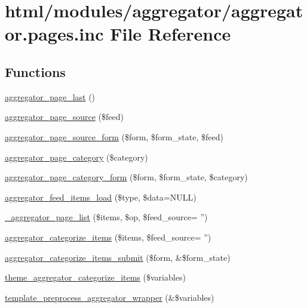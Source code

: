 \hypertarget{aggregator_8pages_8inc}{
\section{html/modules/aggregator/aggregator.pages.inc File Reference}
\label{aggregator_8pages_8inc}
}
\subsection*{Functions}
\begin{DoxyCompactItemize}
\item 
\hyperlink{aggregator_8pages_8inc_a59d236d98e0725864c55ccf6f1ec7eab}{aggregator\_\-page\_\-last} ()
\item 
\hyperlink{aggregator_8pages_8inc_a86e3f4a4faec71de2d52a3c655b62757}{aggregator\_\-page\_\-source} (\$feed)
\item 
\hyperlink{aggregator_8pages_8inc_a8091bff5e7ba3719b50081afe2d51db4}{aggregator\_\-page\_\-source\_\-form} (\$form, \$form\_\-state, \$feed)
\item 
\hyperlink{aggregator_8pages_8inc_aaf7794d54e6d62be94efc636f9a39a4b}{aggregator\_\-page\_\-category} (\$category)
\item 
\hyperlink{aggregator_8pages_8inc_a089dc93129a06c24a1f455105121cb32}{aggregator\_\-page\_\-category\_\-form} (\$form, \$form\_\-state, \$category)
\item 
\hyperlink{aggregator_8pages_8inc_a9418271c731d9c644ef13b40c3a8df6b}{aggregator\_\-feed\_\-items\_\-load} (\$type, \$data=NULL)
\item 
\hyperlink{aggregator_8pages_8inc_a825e07217628ea623b6392c5a38d94f6}{\_\-aggregator\_\-page\_\-list} (\$items, \$op, \$feed\_\-source= '')
\item 
\hyperlink{group__forms_gad110881d125af4a6c5c2182a52fe4c69}{aggregator\_\-categorize\_\-items} (\$items, \$feed\_\-source= '')
\item 
\hyperlink{aggregator_8pages_8inc_a04d005d45c0430ec3b97884ef4470d4f}{aggregator\_\-categorize\_\-items\_\-submit} (\$form, \&\$form\_\-state)
\item 
\hyperlink{group__themeable_gaa166f4c160bdff7532ce6b75a8588d02}{theme\_\-aggregator\_\-categorize\_\-items} (\$variables)
\item 
\hyperlink{aggregator_8pages_8inc_a95bcd00a54c249668f911199fa8021ba}{template\_\-preprocess\_\-aggregator\_\-wrapper} (\&\$variables)
\item 

\end{DoxyCompactItemize}
